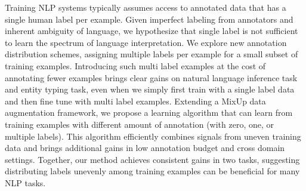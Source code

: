 Training NLP systems typically assumes access to annotated data that has a single human label per example. Given imperfect labeling from annotators and inherent ambiguity of language, we hypothesize that single label is not sufficient to learn the spectrum of language interpretation. We explore new annotation distribution schemes, assigning multiple labels per example for a small subset of training examples. Introducing such multi label examples at the cost of annotating fewer examples brings clear gains on natural language inference task and entity typing task, even when we simply first train with a single label data and then fine tune with multi label examples. Extending a MixUp data augmentation framework, we propose a learning algorithm that can learn from training examples with different amount of annotation (with zero, one, or multiple labels). This algorithm efficiently combines signals from uneven training data and brings additional gains in low annotation budget and cross domain settings. Together, our method achieves consistent gains in two tasks, suggesting distributing labels unevenly among training examples can be beneficial for many NLP tasks.
